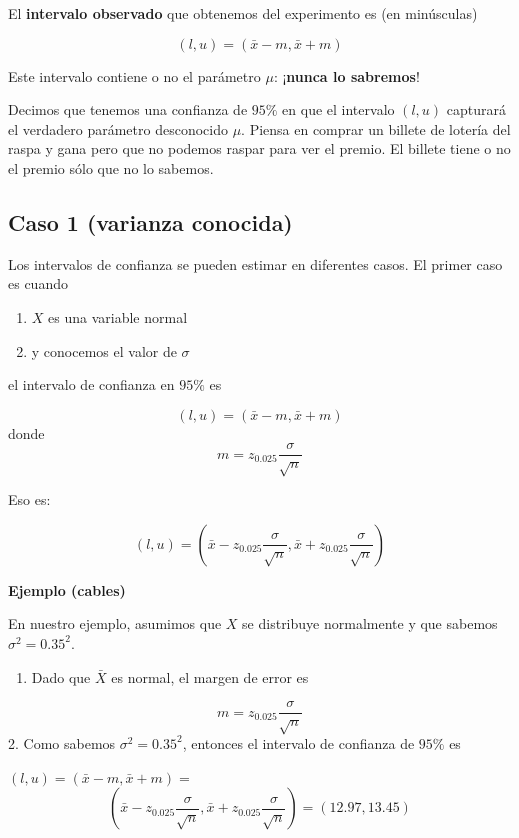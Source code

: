 \documentclass[
]{book}
\providecommand{\tightlist}{%
  \setlength{\itemsep}{0pt}\setlength{\parskip}{0pt}}
\begin{document}
El \textbf{intervalo observado} que obtenemos del experimento es (en minúsculas)

\[(l,u)=(\bar{x} - m,\bar{x} + m)\]

Este intervalo contiene o no el parámetro \(\mu\): ¡\textbf{nunca lo sabremos}!

Decimos que tenemos una confianza de \(95\%\) en que el intervalo \((l,u)\) capturará el verdadero parámetro desconocido \(\mu\). Piensa en comprar un billete de lotería del raspa y gana pero que no podemos raspar para ver el premio. El billete tiene o no el premio sólo que no lo sabemos.

\hypertarget{caso-1-varianza-conocida}{%
\subsection{Caso 1 (varianza conocida)}\label{caso-1-varianza-conocida}}

Los intervalos de confianza se pueden estimar en diferentes casos. El primer caso es cuando

\begin{enumerate}
\def\labelenumi{\arabic{enumi}.}
\tightlist
\item
  \(X\) es una variable normal
\item
  y conocemos el valor de \(\sigma\)
\end{enumerate}

el intervalo de confianza en \(95\%\) es

\[(l,u)=(\bar{x} - m, \bar{x} + m)\]
donde \[m=z_{0.025} \frac{\sigma}{\sqrt{n}}\]

Eso es:

\[(l,u)=(\bar{x} - z_{0.025} \frac{\sigma}{\sqrt{n}}, \bar{x} + z_{0.025} \frac{\sigma}{ \sqrt{n}})\]

\textbf{Ejemplo (cables)}

En nuestro ejemplo, asumimos que \(X\) se distribuye normalmente y que sabemos \(\sigma^2=0.35^2\).

\begin{enumerate}
\def\labelenumi{\arabic{enumi}.}
\tightlist
\item
  Dado que \(\bar{X}\) es normal, el margen de error es
\end{enumerate}

\[m=z_{0.025} \frac{\sigma}{\sqrt{n}}\]
2. Como sabemos \(\sigma^2=0.35^2\), entonces el intervalo de confianza de \(95\%\) es

\((l,u)=(\bar{x} - m, \bar{x} + m)=\) \[(\bar{x}-z_{0.025} \frac{\sigma}{\sqrt{n }}, \bar{x}+z_{0.025} \frac{\sigma}{\sqrt{n}})= (12.97,13.45)\]
\end{document}
